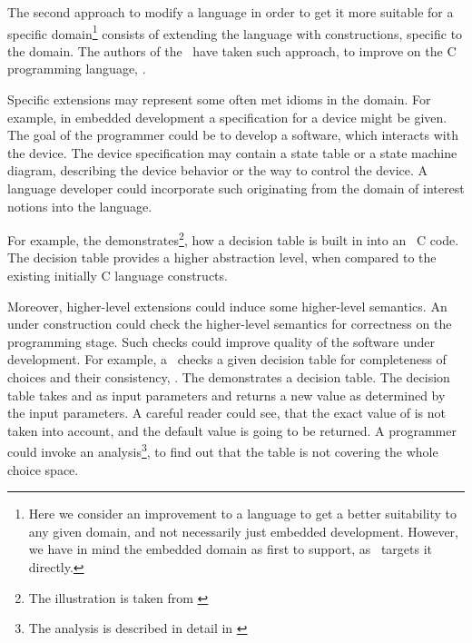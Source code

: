 The second approach to modify a language in order to get it more suitable for a specific domain\footnote{Here we consider an 
improvement to a language to get a better suitability to any given domain, and not necessarily just embedded development.
However, we have in mind the embedded domain as first to support, as \mbdr\ targets it directly.} consists of extending 
the language with constructions, specific to the domain. The authors of the \mbdp\ have taken such approach, to improve on
the C programming language, \cite{2012_voelter_mbeddr_extensible_c_based_language_and_ide_for_embedded}. 

Specific extensions may represent some often met idioms in the domain. For example, in embedded development a 
specification for a device might be given. The goal of the programmer could be to develop a software, which 
interacts with the device. The device specification may contain a state table or  a state machine diagram,
describing the device behavior or the way to control the device. A language developer could incorporate such 
originating from the domain of interest notions into the language.

For example, the 
demonstrates\footnote{The illustration is taken from \cite{2012_ratiu_modular_dsls_and_analyses} }, 
how a decision table is built in into an \mbdr\ C code. The decision table provides a higher abstraction level, 
when compared to the existing initially C language constructs. 


Moreover, higher-level extensions could induce some higher-level semantics. An  under construction could check 
the higher-level semantics for correctness on the programming stage. Such checks could improve 
quality of the software under development. For example, a \mbdr\ checks a given decision table for completeness of choices 
and their consistency, \cite{2012_ratiu_modular_dsls_and_analyses}. The  demonstrates a decision table. 
The decision table takes  and  as input parameters and returns a new  value as determined by the 
input parameters. A careful reader could see, that the exact value  of 
is not taken into account, and the default value  is going to be returned. A programmer could invoke an
analysis\footnote{The analysis is described in detail in  \cite{2012_ratiu_modular_dsls_and_analyses}}, to find out that the 
table is not covering the whole choice space.

